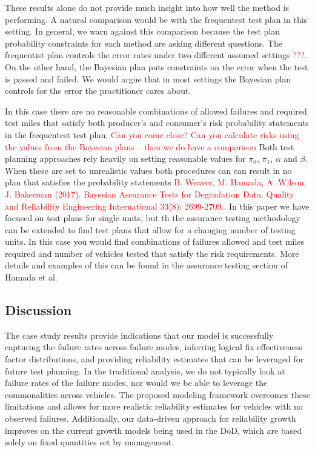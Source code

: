 \documentclass[12pt]{article}
\begin{document}
These results alone do not provide much insight into how well the method is
performing. A natural comparison would be with the frequentest test plan in this
setting.  In general,  we warn against this comparison because the test plan
probability constraints for each  method are asking different questions.  The
frequentist plan controls the error rates  under two different assumed settings \textcolor{red}{???}.
On the other hand, the Bayesian plan puts constraints  on the error when the test
is passed and failed.  We would argue that in most settings  the Bayesian plan
controls for the error the practitioner cares about.

In this case there are no
reasonable combinations of allowed failures and required test miles  that
satisfy both producer's and consumer's risk probability statements in the
frequentest test plan. \textcolor{red}{Can you come close? Can you calculate risks using the values from the Bayesian plans -- then we do have a comparison}
Both test planning approaches rely heavily on setting reasonable values for
$\pi_0$, $\pi_1$, $\alpha$ and $\beta$.   When these are set to unrealistic
values both procedures can can result in no plan that satisfies the probability
statements \textcolor{red}{B. Weaver, M. Hamada, A. Wilson, J. Bakerman (2017). Bayesian Assurance Tests for Degradation Data. Quality and Reliability Engineering International 33(8): 2699-2709.}.  In this paper we have focused on test plans for single units, but
th the assurance testing methodology can be extended to find test plans that
allow for a changing number of testing units.  In this case you would find
combinations of failures allowed and test miles required and number of vehicles
tested that satisfy the risk requirements. More details and examples of this can
be found in the assurance testing section of Hamada et al. ~\cite{ref6}

\subsection{Discussion}
The case study results provide indications that our model is successfully
capturing the failure rates across failure modes, inferring logical fix
effectiveness factor distributions, and providing reliability estimates that can
be leveraged for future test planning. In the traditional analysis, we do not
typically look at failure rates of the failure modes, nor would we be able to
leverage the commonalities across vehicles. The proposed modeling framework
overcomes these limitations and allows for more realistic reliability estimates
for vehicles with no observed failures. Additionally, our data-driven approach
for reliability growth improves on the current growth models being used in the
DoD, which are based solely on fixed quantities set by management.
\end{document}
